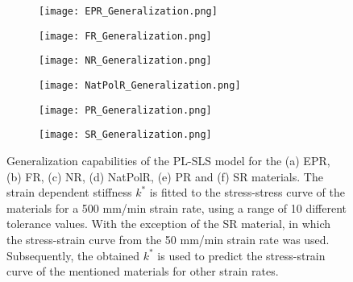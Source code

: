 \begin{figure}[htbp!]
	\centering
    \begin{subfigure}[b]{0.49\textwidth}
        \centering
        \texttt{[image: EPR\_Generalization.png]}
        \caption{}
        \label{fig:GenEPR}
    \end{subfigure}
    \begin{subfigure}[b]{0.49\textwidth}
        \centering
        \texttt{[image: FR\_Generalization.png]}
        \caption{}
        \label{fig:GenFR}
    \end{subfigure}
    \begin{subfigure}[b]{0.49\textwidth}
        \centering
        \texttt{[image: NR\_Generalization.png]}
        \caption{}
        \label{fig:GenNR}
    \end{subfigure}
    \begin{subfigure}[b]{0.49\textwidth}
        \centering
        \texttt{[image: NatPolR\_Generalization.png]}
        \caption{}
        \label{fig:GenNatPolR}
    \end{subfigure}  
    \begin{subfigure}[b]{0.49\textwidth}
        \centering
        \texttt{[image: PR\_Generalization.png]}
        \caption{}
        \label{fig:GenPR}
    \end{subfigure}  
    \begin{subfigure}[b]{0.49\textwidth}
        \centering
        \texttt{[image: SR\_Generalization.png]}
        \caption{}
        \label{fig:GenSR}
    \end{subfigure}  
    \caption{Generalization capabilities of the PL-SLS model for the (a) EPR, (b) FR, (c) NR, (d) NatPolR, (e) PR and (f) SR materials. The strain dependent stiffness $k^*$ is fitted to the stress-stress curve of the materials for a 500 mm/min strain rate, using a range of 10 different tolerance values. With the exception of the SR material, in which the stress-strain curve from the 50 mm/min strain rate was used. Subsequently, the obtained $k^*$ is used to predict the stress-strain curve of the mentioned materials for other strain rates.}
    \label{fig:GenAlmostAll}
\end{figure}


